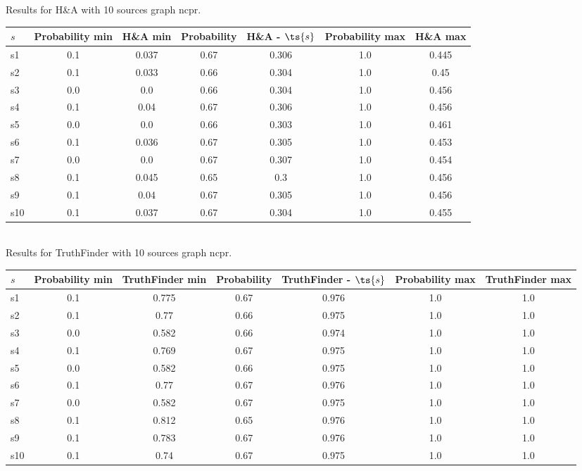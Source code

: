 \documentclass{article}
\begin{document}
\noindent Results for H\&A with 10 sources graph ncpr.

\noindent\begin{tabular}{|l|c|c|c|c|c|c|}
\hline
$s$& Probability min & H\&A min & Probability & H\&A - $\ts{s}$ & Probability max & H\&A max\\
\hline
s1 &0.1 & 0.037 & 0.67 & 0.306 & 1.0 & 0.445\\
\hline
s2 &0.1 & 0.033 & 0.66 & 0.304 & 1.0 & 0.45\\
\hline
s3 &0.0 & 0.0 & 0.66 & 0.304 & 1.0 & 0.456\\
\hline
s4 &0.1 & 0.04 & 0.67 & 0.306 & 1.0 & 0.456\\
\hline
s5 &0.0 & 0.0 & 0.66 & 0.303 & 1.0 & 0.461\\
\hline
s6 &0.1 & 0.036 & 0.67 & 0.305 & 1.0 & 0.453\\
\hline
s7 &0.0 & 0.0 & 0.67 & 0.307 & 1.0 & 0.454\\
\hline
s8 &0.1 & 0.045 & 0.65 & 0.3 & 1.0 & 0.456\\
\hline
s9 &0.1 & 0.04 & 0.67 & 0.305 & 1.0 & 0.456\\
\hline
s10 &0.1 & 0.037 & 0.67 & 0.304 & 1.0 & 0.455\\
\hline
\end{tabular}\\

\noindent Results for TruthFinder with 10 sources graph ncpr.

\noindent\begin{tabular}{|l|c|c|c|c|c|c|}
\hline
$s$& Probability min & TruthFinder min & Probability & TruthFinder - $\ts{s}$ & Probability max & TruthFinder max\\
\hline
s1 &0.1 & 0.775 & 0.67 & 0.976 & 1.0 & 1.0\\
\hline
s2 &0.1 & 0.77 & 0.66 & 0.975 & 1.0 & 1.0\\
\hline
s3 &0.0 & 0.582 & 0.66 & 0.974 & 1.0 & 1.0\\
\hline
s4 &0.1 & 0.769 & 0.67 & 0.975 & 1.0 & 1.0\\
\hline
s5 &0.0 & 0.582 & 0.66 & 0.975 & 1.0 & 1.0\\
\hline
s6 &0.1 & 0.77 & 0.67 & 0.976 & 1.0 & 1.0\\
\hline
s7 &0.0 & 0.582 & 0.67 & 0.975 & 1.0 & 1.0\\
\hline
s8 &0.1 & 0.812 & 0.65 & 0.976 & 1.0 & 1.0\\
\hline
s9 &0.1 & 0.783 & 0.67 & 0.976 & 1.0 & 1.0\\
\hline
s10 &0.1 & 0.74 & 0.67 & 0.975 & 1.0 & 1.0\\
\hline
\end{tabular}\\
\end{document}
